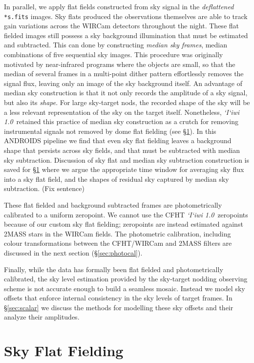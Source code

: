 \documentclass[iop]{emulateapj}
\newcommand{\sw}[1]{\textit{#1}} %
\newcommand{\iiwione}{\sw{`I`iwi 1.0}}
\newcommand{\todo}[1]{\textcolor{RedOrange}{#1}} %
\newcommand{\Sec}[1]{\S\ref{sec:#1}}  %
\begin{document}
In parallel, we apply flat fields constructed from sky signal in the \textit{deflattened} \texttt{*s.fits} images.
Sky flats produced the observations themselves are able to track gain variations across the WIRCam detectors throughout the night.
These flat fielded images still possess a sky background illumination that must be estimated and subtracted.
This can done by constructing \textit{median sky frames}, median combinations of five sequential sky 
images.
This procedure was originally motivated by near-infrared programs where the objects are small, so that the median of several frames in a multi-point dither pattern effortlessly removes the signal flux, leaving only an image of the sky background itself.
An advantage of median sky construction is that it not only records the amplitude of a sky signal, but also its \emph{shape}.
For large sky-target nods, the recorded shape of the sky will be a less relevant representation of the sky on the target itself.
Nonetheless, \iiwione\ retained this practice of median sky construction as a crutch for removing instrumental signals not removed by dome flat fielding (see \Sec{flats}). In this ANDROIDS pipeline we find that even sky flat fielding leaves a background shape that persists across sky fields, and that must be subtracted with median sky subtraction.
Discussion of sky flat and median sky subtraction construction is saved for \Sec{flats} where we argue the appropriate time window for averaging sky flux into a sky flat field, and the shapes of residual sky captured by median sky subtraction. \todo{(Fix sentence)}

These flat fielded and background subtracted frames are photometrically calibrated to a uniform zeropoint.
We cannot use the CFHT \iiwione\ zeropoints because of our custom sky flat fielding; zeropoints are instead estimated against 2MASS stars in the WIRCam fields.
The photometric calibration, including colour transformations between the CFHT/WIRCam and 2MASS filters are discussed in the next section (\Sec{photocal}).

Finally, while the data has formally been flat fielded and photometrically calibrated, the sky level estimation provided by the sky-target nodding observing scheme is not accurate enough to build a seamless mosaic.
Instead we model sky offsets that enforce internal consistency in the sky levels of target frames.
In \Sec{scalar} we discuss the methods for modelling these sky offsets and their analyze their amplitudes.

\section{Sky Flat Fielding}
\label{sec:flats}
\end{document}
